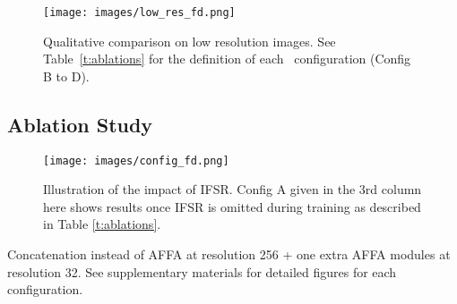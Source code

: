 \documentclass[10pt,twocolumn,letterpaper]{article}
\newcommand{\fti}[1]{\textit{FaceDancer}{#1}}
\begin{document}
\begin{figure}[!t]
\centering
\texttt{[image: images/low\_res\_fd.png]}
\caption{Qualitative comparison on low resolution images. See Table~\ref{t:ablations} for the definition of each \fti~configuration (Config B to D).}
\label{fig:lowres}
\end{figure}






\subsection{Ablation Study}






\begin{figure}[!t]
\centering
\texttt{[image: images/config\_fd.png]}
\caption{Illustration of the impact of IFSR. Config A given in the 3rd column here shows results once IFSR is omitted during  training as described in Table \ref{t:ablations}.}
\label{fig:configcomp}
\end{figure}






\begin{table*}[!t]
\centering
\caption{Ablative analysis together with the runtime performance.  Inference time is given in millisecond and memory usage in GB. All models in this table were trained for 300k iterations.}
\label{t:ablations}
\begin{center}
\end{center}
{\scriptsize * Concatenation instead of AFFA at resolution 256 + one extra AFFA modules at resolution 32. See supplementary materials for detailed figures for each configuration.}
\end{table*}
\end{document}
